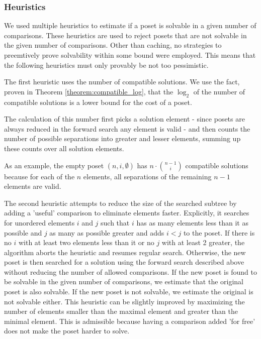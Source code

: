 \documentclass[10pt,journal,compsoc]{IEEEtran}
\begin{document}
\subsubsection{Heuristics}

We used multiple heuristics to estimate if a poset is solvable in a given number of comparisons.
These heuristics are used to reject posets that are not solvable in the given number of comparisons.
Other than caching, no strategies to preemtively prove solvability within
some bound were employed. This means that the following heuristics must
only provably be not too pessimistic.

The first heuristic uses the number of compatible solutions.
We use the fact, proven in Theorem \ref{theorem:compatible_log}, that the $\log_2$ of
the number of compatible solutions is a lower bound for the cost of a poset.

The calculation of this number first picks a solution element - since posets
are always reduced in the forward search any element is valid -
and then counts the number of possible separations into greater and lesser elements,
summing up these counts over all solution elements.

As an example, the empty poset $(n,i,\emptyset)$ has $n\cdot\binom{n-1}{i}$ compatible solutions because
for each of the $n$ elements, all separations of the remaining $n-1$ elements
are valid.


The second heuristic attempts to reduce the size of the searched subtree by adding a
'useful' comparison to eliminate elements faster. Explicitly, it searches for
unordered elements $i$ and $j$ such that $i$ has as many elements less than it as possible
and $j$ as many as possible greater and adds $i<j$ to the poset.
If there is no $i$ with at least two elements less than it or no $j$ with
at least 2 greater, the algorithm aborts the heuristic and resumes
regular search.
Otherwise, the new poset is then searched for a solution using the forward search described above
without reducing the number of allowed comparisons.
If the new poset is found to be solvable in the given number of comparisons, we estimate that the original poset is also solvable.
If the new poset is not solvable, we estimate the original is not solvable either.
This heuristic can be slightly improved by maximizing the number of elements smaller than the maximal element and greater than the minimal element.
This is admissible because having a comparison added 'for free' does not make the
poset harder to solve.
\end{document}

